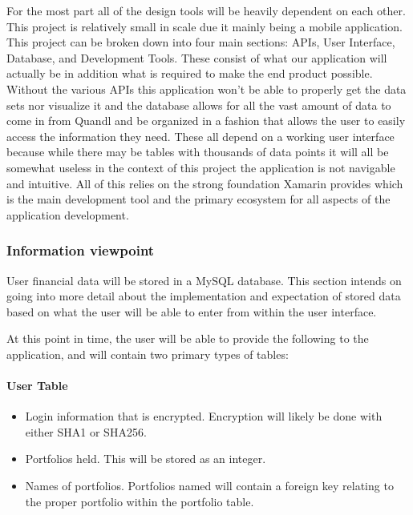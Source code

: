 \documentclass[onecolumn, draftclsnofoot,10pt, compsoc]{IEEEtran}
\begin{document}
      For the most part all of the design tools will be heavily dependent on each other. This project is relatively small in scale due it mainly being a mobile application. This project can be broken down into four main
      sections: APIs, User Interface, Database, and Development Tools. These consist of what our application will actually be in addition what is required to make the end product possible. Without the various APIs this
      application won't be able to properly get the data sets nor visualize it and the database allows for all the vast amount of data to come in from Quandl and be organized in a fashion that allows the user to easily access the
      information they need. These all depend on a working user interface because while there may be tables with thousands of data points it will all be somewhat useless in the context of this project the application is not
      navigable and intuitive. All of this relies on the strong foundation Xamarin provides which is the main development tool and the primary ecosystem for all aspects of the application development. 

\subsubsection{Information viewpoint}

        User financial data will be stored in a MySQL database. This section intends on going into more detail
        about the implementation and expectation of stored
        data based on what the user will be able to enter from within the user interface.

        At this point in time, the user will be able to provide the following to the application, and will contain two primary types of tables:

\paragraph{User Table}
\begin{itemize}
    \item Login information that is encrypted. Encryption will likely be done with either SHA1 or SHA256.
    \item Portfolios held. This will be stored as an integer.
    \item Names of portfolios. Portfolios named will contain a foreign key relating to the proper portfolio within the portfolio table.
\end{itemize}
\end{document}
